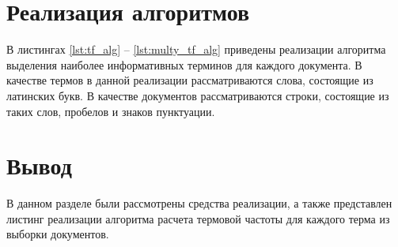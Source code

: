 \section{Реализация алгоритмов}

В листингах \ref{lst:tf_alg} -- \ref{lst:multy_tf_alg} приведены реализации алгоритма выделения наиболее информативных терминов для каждого документа. 
В качестве термов в данной реализации рассматриваются слова, состоящие из латинских букв. В качестве документов рассматриваются строки, состоящие из таких слов, пробелов и знаков пунктуации.

\clearpage



\clearpage



\clearpage




\section*{Вывод}

В данном разделе были рассмотрены средства реализации, а также представлен листинг реализации алгоритма расчета термовой частоты для каждого терма из выборки документов.